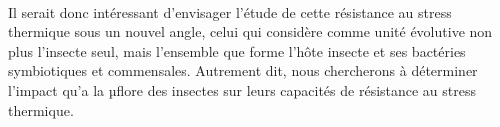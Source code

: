 
\paragraph{} %
\label{par:intro3}

Il serait donc intéressant d'envisager l'étude de cette résistance au stress thermique sous un nouvel angle, celui qui considère comme unité évolutive non plus l'insecte seul, mais l'ensemble que forme l'hôte insecte et ses bactéries symbiotiques et commensales.
Autrement dit, nous chercherons à déterminer l'impact qu'a la µflore des insectes sur leurs capacités de résistance au stress thermique.

%



